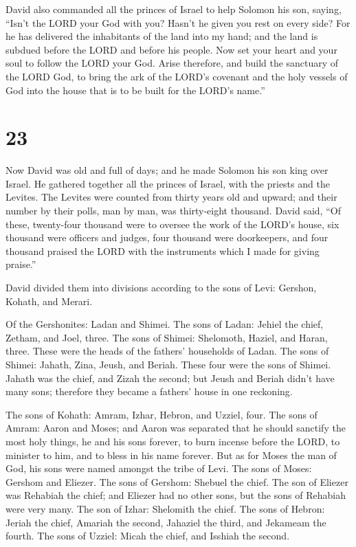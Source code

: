 David also commanded all the princes of Israel to help
Solomon his son, saying,  ``Isn't the LORD your God with
you? Hasn't he given you rest on every side? For he has delivered the
inhabitants of the land into my hand; and the land is subdued before the
LORD and before his people.  Now set your heart and your
soul to follow the LORD your God. Arise therefore, and build the
sanctuary of the LORD God, to bring the ark of the LORD's covenant and
the holy vessels of God into the house that is to be built for the
LORD's name.''

\hypertarget{section-22}{%
\section{23}\label{section-22}}

 Now David was old and full of days; and he made Solomon his
son king over Israel.  He gathered together all the princes
of Israel, with the priests and the Levites.  The Levites
were counted from thirty years old and upward; and their number by their
polls, man by man, was thirty-eight thousand.  David said,
``Of these, twenty-four thousand were to oversee the work of the LORD's
house, six thousand were officers and judges,  four thousand
were doorkeepers, and four thousand praised the LORD with the
instruments which I made for giving praise.''

 David divided them into divisions according to the sons of
Levi: Gershon, Kohath, and Merari.

 Of the Gershonites: Ladan and Shimei.  The sons
of Ladan: Jehiel the chief, Zetham, and Joel, three.  The
sons of Shimei: Shelomoth, Haziel, and Haran, three. These were the
heads of the fathers' households of Ladan.  The sons of
Shimei: Jahath, Zina, Jeush, and Beriah. These four were the sons of
Shimei.  Jahath was the chief, and Zizah the second; but
Jeush and Beriah didn't have many sons; therefore they became a fathers'
house in one reckoning.

 The sons of Kohath: Amram, Izhar, Hebron, and Uzziel,
four.  The sons of Amram: Aaron and Moses; and Aaron was
separated that he should sanctify the most holy things, he and his sons
forever, to burn incense before the LORD, to minister to him, and to
bless in his name forever.  But as for Moses the man of
God, his sons were named amongst the tribe of Levi.  The
sons of Moses: Gershom and Eliezer.  The sons of Gershom:
Shebuel the chief.  The son of Eliezer was Rehabiah the
chief; and Eliezer had no other sons, but the sons of Rehabiah were very
many.  The son of Izhar: Shelomith the chief. 
The sons of Hebron: Jeriah the chief, Amariah the second, Jahaziel the
third, and Jekameam the fourth.  The sons of Uzziel: Micah
the chief, and Isshiah the second.

